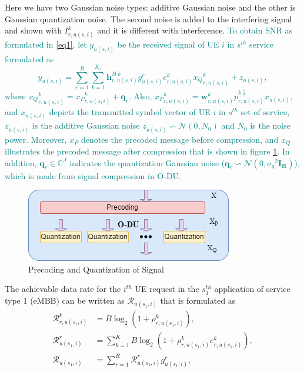 \documentclass[lettersize,journal]{IEEEtran}
\begin{document}
\textcolor{NavyBlue}{Here we have two Gaussian noise types: additive Gaussian noise and the other is Gaussian quantization noise. The second noise is added to the interfering signal and shown with $ I_{r,u(s,i)}^{k}$ and it is different with interference.}
\textcolor{teal}{To obtain SNR as formulated in \eqref{eq1}, let $y_{u(s,i)} $ be the received signal of UE $i$ in $s^{th}$ service formulated as
\begin{equation}\label{eq2}
y_{u(s,i)} = \sum_{r = 1}^{R}\sum_{k=1}^{K_s} \boldsymbol{h}^{H \: k}_{r,u(s,i)} g_{u(s,i)}^r e^k_{r,u(s,i)}{x_Q}^k_{r,u(s,i)}+ z_{u(s,i)},
\end{equation}
}
\textcolor{teal}{where ${x_Q}^k_{r,u(s,i)} ={x_P}^k_{r,u(s,i)}+ \boldsymbol{q}_{r}$. Also, ${x_P}^k_{r,u(s,i)}= \boldsymbol{w}^k_{r,u(s,i)}{p^{k \: \frac{1}{2}}_{r,u(s,i)}} x_{u(s,i)} $, and  $ x_{u(s,i)}$ depicts the transmitted symbol vector of UE $i$ in $s^{th}$ set of service,  $z_{u(s,i)}$ is the additive Gaussian noise $z_{u(s,i)} \backsim \mathcal{N}(0,N_0)$ and $N_0$ is the noise power.
Moreover, ${x_P}$ denotes the precoded message before compression, and ${x_Q}$ illustrates the precoded message after compression that is shown in figure \ref{fig:pq}. 
In addition, $\boldsymbol{q}_{r} \in \mathbb{C}^{J }  $ indicates the quantization Gaussian noise 
($\boldsymbol{q}_{r} \backsim \mathcal{N}(0,{\sigma_q}^2\boldsymbol{I_{R}} )$), which is made from signal compression in O-DU.}
\begin{figure}
  \centering 
  \captionsetup{justification=centering}
    \includegraphics[scale = 0.45]{Qdiag.png}
  \caption{Precoding and Quantization of Signal}
  \label{fig:pq}
\end{figure}
The achievable data rate for the $i^{th}$ UE request in the $s_{1}^{th}$ application of service type 1 (eMBB) can be written as $\mathcal{R}_{u(s_1,i)}$ that is formulated as
\begin{equation}\label{eq3}
\begin{split}
\mathcal{{R}}_{r,u(s_1,i)}^{k} &=  B \log_2({1+ \rho_{r,u(s_1,i)}^{k}}) ,\\
\mathcal{R}_{u(s_1,i)}^{r} &= \sum_{k=1}^{K} B \log_2({1+ \rho_{r,u(s_1,i)}^{k}} e^k_{r,u(s_1,i)}),\\
\mathcal{R}_{u(s_1,i)} &= \sum_{r=1}^{R}\mathcal{R}_{u(s_1,i)}^{r} g^r_{u(s_1,i)},
\end{split}
\end{equation}
\end{document}
